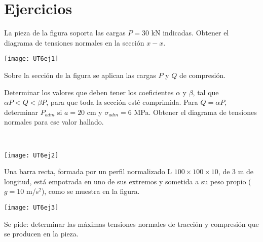 \section{Ejercicios}
\setcounter{ejercicio}{0}

\ejercicio 

La pieza de la figura soporta las cargas $P=30$ kN indicadas. Obtener el diagrama de tensiones normales en la sección $x-x$.

\begin{center}
  \texttt{[image: UT6ej1]}
\end{center}

\ejercicio 

\begin{minipage}[b]{0.55\textwidth}
Sobre la sección de la figura se aplican las cargas $P$ y $Q$ de compresión.

\parte Determinar los valores que deben tener los coeficientes $\alpha$ y $\beta$, tal que $\alpha P < Q < \beta P$, para que toda la sección esté comprimida.
\parte Para $Q= \alpha P$, determinar $P_{adm}$ si $a=20$ cm y $\sigma_{adm}=6$ MPa. Obtener el diagrama de tensiones normales para ese valor hallado.
\end{minipage}
~
\begin{minipage}[b]{0.45\textwidth}
\begin{center}
	\texttt{[image: UT6ej2]}
\end{center}
\end{minipage}

\ejercicio 

Una barra recta, formada por un perfil normalizado L $100\times 100\times 10$, de $3 $ m de longitud, está empotrada en uno de sus extremos y sometida a su peso propio ($g=10 $ m/s$^2$), como se muestra en la figura.


\begin{center}
\texttt{[image: UT6ej3]}
\end{center}

Se pide: determinar las máximas tensiones normales de tracción y compresión que se producen en la pieza.

\ejercicio 


